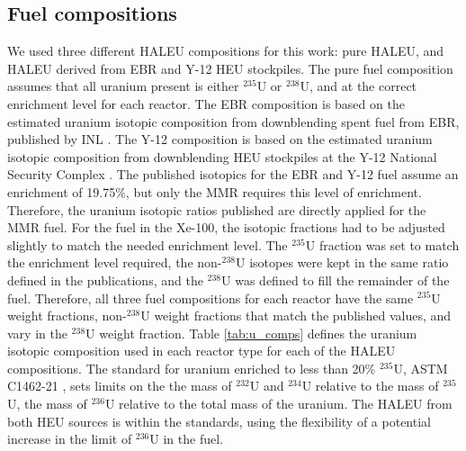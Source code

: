 \subsection{Fuel compositions}
We used three different \gls{HALEU} compositions for this work: pure 
\gls{HALEU}, and \gls{HALEU} derived from \gls{EBR} and Y-12 \gls{HEU} 
stockpiles. The pure fuel composition assumes that all uranium present is 
either $^{235}$U or $^{238}$U, and at the correct enrichment level for each 
reactor. The \gls{EBR} 
composition is based on the estimated uranium isotopic composition from 
downblending spent fuel from \gls{EBR}, published by \gls{INL} 
\cite{vaden_isotopic_2018}. The Y-12 composition is based on the 
estimated uranium isotopic composition from downblending \gls{HEU} 
stockpiles at the Y-12 National Security Complex \cite{nelson_foreign_2010}.
The published isotopics for the \gls{EBR} and Y-12 fuel assume an enrichment 
of 19.75\%, but only the \gls{MMR} requires this level of enrichment. 
Therefore, the uranium isotopic ratios 
published are directly applied for the \gls{MMR} fuel. For the fuel in the 
Xe-100, the isotopic fractions had to be adjusted slightly to match the 
needed enrichment level. The $^{235}$U fraction was set to match the 
enrichment level required, the non-$^{238}$U isotopes were kept in the 
same ratio defined in the publications, and the $^{238}$U was defined to fill 
the remainder of the fuel. Therefore, all three fuel compositions for each 
reactor have the same $^{235}$U weight fractions, non-$^{238}$U weight
fractions that match the published values, and vary in the $^{238}$U 
weight fraction. Table \ref{tab:u_comps} defines the uranium isotopic
composition used 
in each reactor type for each of the \gls{HALEU} compositions. The 
standard for uranium enriched to less than 20\% $^{235}$U, ASTM C1462-21 
\cite{noauthor_standard_2021-1}, sets limits on the the mass of 
$^{232}$U and $^{234}$U relative to the mass of $^{235}$U, the mass of 
$^{236}$U relative to the total mass of the uranium.
The \gls{HALEU} from both \gls{HEU} sources is within the standards, 
using the flexibility of a potential increase in the limit of 
$^{236}$U in the fuel. 

